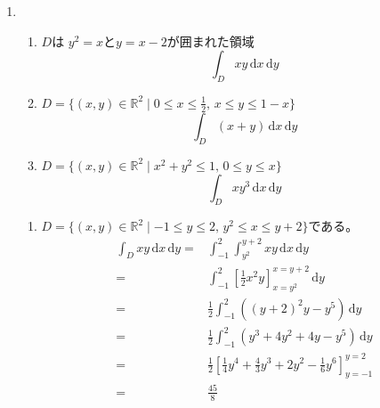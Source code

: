 \documentclass[12pt,b5paper]{ltjsarticle}
\begin{document}
\begin{enumerate}
 \item 
       \begin{enumerate}
        \item
             $D$は $y^2=x$と$y=x-2$が囲まれた領域
             \begin{equation}
              \int_{D}xy \,\mathrm{d}x\,\mathrm{d}y
             \end{equation}
        \item
             $D= \{ (x,y)\in\mathbb{R}^2 \mid 0\leq x \leq \frac{1}{2}, \, x\leq y\leq 1-x \}$
             \begin{equation}
              \int_{D}(x+y) \,\mathrm{d}x\,\mathrm{d}y
             \end{equation}
        \item
             $D= \{ (x,y)\in\mathbb{R}^2 \mid x^2 + y^2 \leq 1, \, 0\leq y\leq x \}$
             \begin{equation}
              \int_{D}xy^3 \,\mathrm{d}x\,\mathrm{d}y
             \end{equation}
       \end{enumerate}

       \dotfill

       \begin{enumerate}
        \item
             $D=\{ (x,y)\in\mathbb{R}^2 \mid -1\leq y \leq 2, \, y^2\leq x\leq y+2 \}$である。
             \begin{align}
              \int_{D}xy \,\mathrm{d}x\,\mathrm{d}y
              =& \int_{-1}^{2} \int_{y^2}^{y+2}xy \,\mathrm{d}x\,\mathrm{d}y\\
              =& \int_{-1}^{2} \left[ \frac{1}{2}x^2y \right]_{x=y^2}^{x=y+2}\,\mathrm{d}y\\
              =&  \frac{1}{2} \int_{-1}^{2} \left( (y+2)^2y-y^5 \right)\,\mathrm{d}y\\
              =&  \frac{1}{2} \int_{-1}^{2} \left( y^3 + 4y^2 + 4y-y^5 \right)\,\mathrm{d}y\\
              =&  \frac{1}{2} \left[ \frac{1}{4}y^4 + \frac{4}{3}y^3 + 2y^2-\frac{1}{6}y^6 \right]_{y=-1}^{y=2} \\
              =& \frac{45}{8}
             \end{align}


%
%
%
%
%




\end{enumerate}
\end{enumerate}
\end{document}
